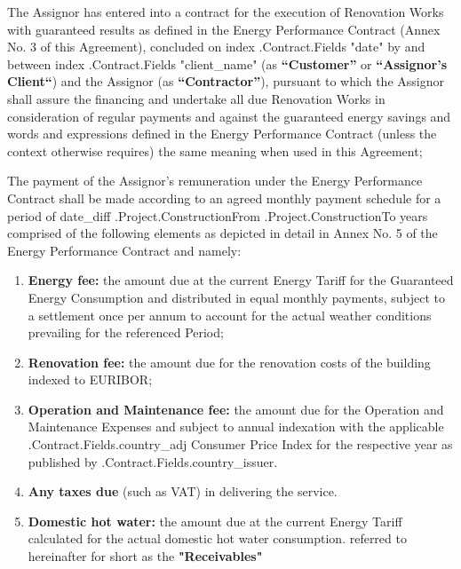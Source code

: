 \documentclass[a4paper]{article}
\begin{document}
\vspace{5mm}

The Assignor has entered into a contract for the execution of
Renovation Works with guaranteed results as defined in the Energy
Performance Contract (Annex No. 3 of this Agreement), concluded on
{{index .Contract.Fields "date"}} by and between {{index .Contract.Fields "client_name"}}
(as \textbf{“Customer”} or \textbf{“Assignor’s
  Client“}) and the Assignor (as \textbf{“Contractor”}), pursuant to
which the Assignor shall assure the financing and undertake all due
Renovation Works in consideration of regular payments and against the
guaranteed energy savings and words and expressions defined in the
Energy Performance Contract (unless the context otherwise requires)
the same meaning when used in this Agreement;\par

\vspace{5mm}

The payment of the Assignor’s remuneration under the Energy
Performance Contract shall be made according to an agreed monthly
payment schedule for a period of {{date_diff .Project.ConstructionFrom .Project.ConstructionTo}}
years comprised of the following elements as
depicted in detail in Annex No. 5 of the Energy Performance Contract
and namely:\par

\vspace{5mm}

\begin{enumerate}
\item{\textbf{Energy fee:} the amount due at the current Energy Tariff
    for the Guaranteed Energy Consumption and distributed in equal
    monthly payments, subject to a settlement once per annum to
    account for the actual weather conditions prevailing for the
    referenced Period;}

\item{\textbf{Renovation fee:} the amount due for the renovation costs
    of the building indexed to EURIBOR;}

\item{\textbf{Operation and Maintenance fee:} the amount due for the
    Operation and Maintenance Expenses and subject to annual
    indexation with the applicable {{.Contract.Fields.country_adj}} Consumer Price Index for
    the respective year as published by {{.Contract.Fields.country_issuer}}.}

\item{\textbf{Any taxes due} (such as VAT) in delivering the service.}

\item{\textbf{Domestic hot water:} the amount due at the current
    Energy Tariff calculated for the actual domestic hot water
    consumption. referred to hereinafter for short as the
    \textbf{"Receivables"}}
\end{enumerate}
\end{document}
